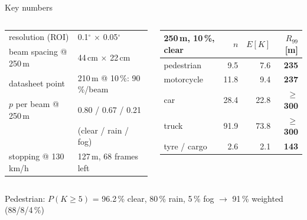 \documentclass[aspectratio=169,11pt]{beamer}
\newcommand{\fail}[1]{\textcolor{red!70!black}{\textbf{#1}}}
\newcommand{\pass}[1]{\textcolor{green!45!black}{\textbf{#1}}}
\begin{document}
\begin{frame}{Key numbers}
  \footnotesize\setlength{\tabcolsep}{4pt}
  \begin{columns}[t]
    \begin{tabular}{ll}
      \toprule
      resolution (ROI) & 0.1$^\circ$ $\times$ 0.05$^\circ$ \\
      beam spacing @ 250\,m & 44\,cm $\times$ 22\,cm \\
      datasheet point & 210\,m @ 10\,\%: 90\,\%/beam \\
      $p$ per beam @ 250\,m & 0.80 / 0.67 / 0.21 \\
      & \scriptsize(clear / rain / fog) \\
      stopping @ 130\,km/h & 127\,m, 68 frames left \\
      \bottomrule
    \end{tabular}
    \begin{tabular}{lrrr}
      \toprule
      250\,m, 10\,\%, clear & $n$ & $E[K]$ & $R_{99}$ [m] \\
      \midrule
      pedestrian & 9.5 & 7.6 & \fail{235} \\
      motorcycle & 11.8 & 9.4 & \fail{237} \\
      car & 28.4 & 22.8 & \pass{$\ge$300} \\
      truck & 91.9 & 73.8 & \pass{$\ge$300} \\
      tyre / cargo & 2.6 & 2.1 & \fail{143} \\
      \bottomrule
    \end{tabular}
  \end{columns}
  \vspace{1em}
  \centering
  Pedestrian: $P(K\ge5)$ = 96.2\,\% clear, 80\,\% rain, 5\,\% fog $\rightarrow$ 91\,\% weighted (88/8/4\,\%)
\end{frame}
\end{document}
